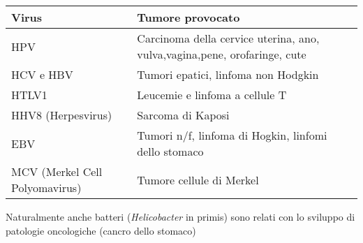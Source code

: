\documentclass[italian,]{article}
\newcommand{\greenbox}[2]{\begin{tcolorbox}[title=#1,colback=green!5,colframe=green!35!black]#2\end{tcolorbox}} %
\begin{document}
\greenbox{Altri virus oncogeni}{
\begin{longtable}[]{@{}ll@{}}
\toprule
\begin{minipage}[b]{0.28\columnwidth}\raggedright
Virus\strut
\end{minipage} & \begin{minipage}[b]{0.66\columnwidth}\raggedright
Tumore provocato\strut
\end{minipage}\tabularnewline
\midrule
\endhead
\begin{minipage}[t]{0.28\columnwidth}\raggedright
HPV\strut
\end{minipage} & \begin{minipage}[t]{0.66\columnwidth}\raggedright
Carcinoma della cervice uterina, ano, vulva,vagina,pene, orofaringe,
cute\strut
\end{minipage}\tabularnewline
\begin{minipage}[t]{0.28\columnwidth}\raggedright
HCV e HBV\strut
\end{minipage} & \begin{minipage}[t]{0.66\columnwidth}\raggedright
Tumori epatici, linfoma non Hodgkin\strut
\end{minipage}\tabularnewline
\begin{minipage}[t]{0.28\columnwidth}\raggedright
HTLV1\strut
\end{minipage} & \begin{minipage}[t]{0.66\columnwidth}\raggedright
Leucemie e linfoma a cellule T\strut
\end{minipage}\tabularnewline
\begin{minipage}[t]{0.28\columnwidth}\raggedright
HHV8 (Herpesvirus)\strut
\end{minipage} & \begin{minipage}[t]{0.66\columnwidth}\raggedright
Sarcoma di Kaposi\strut
\end{minipage}\tabularnewline
\begin{minipage}[t]{0.28\columnwidth}\raggedright
EBV\strut
\end{minipage} & \begin{minipage}[t]{0.66\columnwidth}\raggedright
Tumori n/f, linfoma di Hogkin, linfomi dello stomaco\strut
\end{minipage}\tabularnewline
\begin{minipage}[t]{0.28\columnwidth}\raggedright
MCV (Merkel Cell Polyomavirus)\strut
\end{minipage} & \begin{minipage}[t]{0.66\columnwidth}\raggedright
Tumore cellule di Merkel\strut
\end{minipage}\tabularnewline
\bottomrule
\end{longtable}

Naturalmente anche batteri (\emph{Helicobacter} in primis) sono relati con lo sviluppo di patologie oncologiche (cancro dello stomaco)
}
\end{document}
